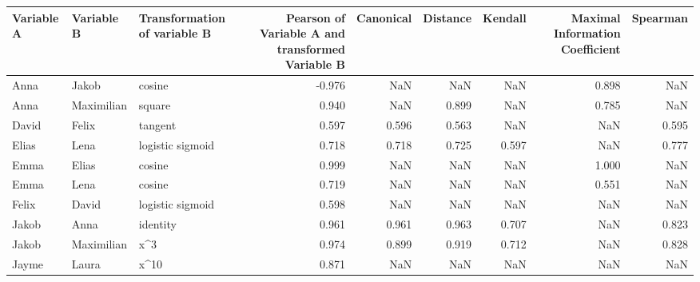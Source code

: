 \begin{tabular}{lllrrrrrr}
\toprule
Variable A & Variable B &            Transformation of variable B &  Pearson of Variable A and transformed Variable B &  Canonical &  Distance &  Kendall &  Maximal Information Coefficient &  Spearman \\
\midrule
      Anna &      Jakob &                                  cosine &                                            -0.976 &        NaN &       NaN &      NaN &                            0.898 &       NaN \\
      Anna & Maximilian &                                  square &                                             0.940 &        NaN &     0.899 &      NaN &                            0.785 &       NaN \\
     David &      Felix &                                 tangent &                                             0.597 &      0.596 &     0.563 &      NaN &                              NaN &     0.595 \\
     Elias &       Lena &                        logistic sigmoid &                                             0.718 &      0.718 &     0.725 &    0.597 &                              NaN &     0.777 \\
      Emma &      Elias &                                  cosine &                                             0.999 &        NaN &       NaN &      NaN &                            1.000 &       NaN \\
      Emma &       Lena &                                  cosine &                                             0.719 &        NaN &       NaN &      NaN &                            0.551 &       NaN \\
     Felix &      David &                        logistic sigmoid &                                             0.598 &        NaN &       NaN &      NaN &                              NaN &       NaN \\
     Jakob &       Anna &                                identity &                                             0.961 &      0.961 &     0.963 &    0.707 &                              NaN &     0.823 \\
     Jakob & Maximilian &                                     x\textasciicircum 3 &                                             0.974 &      0.899 &     0.919 &    0.712 &                              NaN &     0.828 \\
     Jayme &      Laura &                                    x\textasciicircum 10 &                                             0.871 &        NaN &       NaN &      NaN &                              NaN &       NaN \\

\end{tabular}
